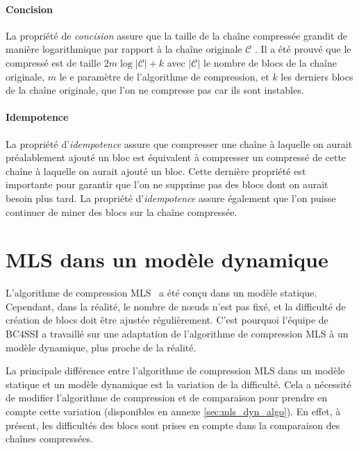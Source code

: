     \paragraph{Concision} La propriété de \textit{concision} assure que la
    taille de la chaîne compressée grandit de manière logarithmique par rapport
    à la chaîne originale $\mathcal{C}$ . Il a été prouvé que le compressé est
    de taille $2m \log{|\mathcal{C}|} + k$ avec $|\mathcal{C}|$ le nombre de
    blocs de la chaîne originale, $m$ le e paramètre de l'algorithme de
    compression, et $k$ les derniers blocs de la chaîne originale, que l'on ne
    compresse pas car ils sont instables.

    \paragraph{Idempotence} La propriété d'\textit{idempotence} assure que
    compresser une chaîne à laquelle on aurait préalablement ajouté un bloc est
    équivalent à compresser un compressé de cette chaîne à laquelle on aurait
    ajouté un bloc. Cette dernière propriété est importante pour garantir que
    l'on ne supprime pas des blocs dont on aurait besoin plus tard. La propriété
    d'\textit{idempotence} assure également que l'on puisse continuer de miner
    des blocs sur la chaîne compressée.
    

\section{MLS dans un modèle dynamique}\label{sec:mls_dynamic}


    L'algorithme de compression MLS~\cite{mls} a été conçu dans un modèle
    statique. Cependant, dans la réalité, le nombre de nœuds n'est pas fixé, et
    la difficulté de création de blocs doit être ajustée régulièrement. C'est
    pourquoi l'équipe de BC4SSI a travaillé sur une adaptation de l'algorithme
    de compression MLS à un modèle dynamique, plus proche de
    la réalité.

    La principale différence entre l'algorithme de compression MLS dans un
    modèle statique et un modèle dynamique est la variation de la difficulté.
    Cela a nécessité de modifier l'algorithme de compression et de comparaison
    pour prendre en compte cette variation (disponibles en annexe
    \ref{sec:mls_dyn_algo}). En effet, à présent, les difficultés des blocs sont
    prises en compte dans la comparaison des chaînes compressées.
    
